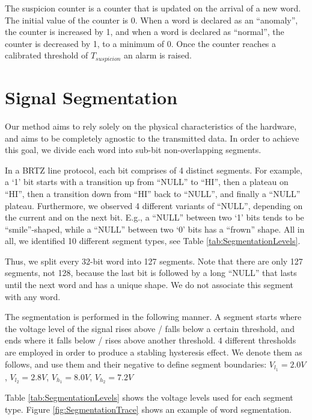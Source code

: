 \documentclass[english]{llncs}
\newcommand{\level}[1]{\section{#1}}
\newcommand{\level}[1]{\chapter{#1}}
\begin{document}
  The suspicion counter is a counter that is updated on the arrival of a new word. The initial value of the counter is 0. When a word is declared as an ``anomaly'', the counter is increased by 1, and when a word is declared as ``normal'', the counter is decreased by 1, to a minimum of 0. Once the counter reaches a calibrated threshold of $T_{suspicion}$ an alarm is raised.
  
\level{Signal Segmentation} \label{SignalSegmentation}
  Our method aims to rely solely on the physical characteristics of the hardware, and aims to be completely agnostic to the transmitted data. In order to achieve this goal, we divide each word into sub-bit non-overlapping segments.
  
  In a BRTZ line protocol, each bit comprises of 4 distinct segments. For example, a `1' bit starts with a transition up from ``NULL'' to ``HI'', then a plateau on ``HI'', then a transition down from ``HI'' back to ``NULL'', and finally a ``NULL'' plateau. Furthermore, we observed 4 different variants of ``NULL'', depending on the current and on the next bit. E.g., a ``NULL'' between two `1' bits tends to be ``smile''-shaped, while a ``NULL'' between two `0' bits has a ``frown'' shape. All in all, we identified 10 different segment types, see Table \ref{tab:SegmentationLevels}.
  
  Thus, we split every 32-bit word into 127 segments. Note that there are only 127 segments, not 128, because the last bit is followed by a long ``NULL'' that lasts until the next word and has a unique shape. We do not associate this segment with any word.
  
  The segmentation is performed in the following manner. A segment starts where the voltage level of the signal rises above / falls below a certain threshold, and ends where it falls below / rises above another threshold. 4 different thresholds are employed in order to produce a stabling hysteresis effect. We denote them as follows, and use them and their negative to define segment boundaries: \(V_{l_1} = 2.0V\), \(V_{l_2} = 2.8V\), \(V_{h_1} = 8.0V\), \(V_{h_2} = 7.2V\)
  
  Table \ref{tab:SegmentationLevels} shows the voltage levels used for each segment type. Figure \ref{fig:SegmentationTrace} shows an example of word segmentation.
  
\end{document}
